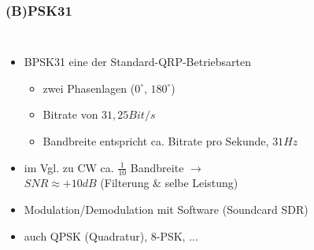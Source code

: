 \begin{frame}
  \frametitle{(B)PSK31}

  \begin{columns}[c]
    \begin{itemize}
      \item BPSK31 eine der Standard-QRP-Betriebsarten
        \begin{itemize}
          \item zwei Phasenlagen ($0^{\circ}$, $180^{\circ}$)
          \item Bitrate von $31,25 Bit/s$
          \item Bandbreite entspricht ca. Bitrate pro Sekunde, $31Hz$
        \end{itemize}
      \item im Vgl. zu CW ca. $\frac{1}{10}$ Bandbreite $\rightarrow$ \\
        $SNR \approx +10dB$ (Filterung \& selbe Leistung)
      \item Modulation/Demodulation mit Software (Soundcard SDR)
      \item auch QPSK (Quadratur), 8-PSK, ...
    \end{itemize}


\end{columns}
\end{frame}

